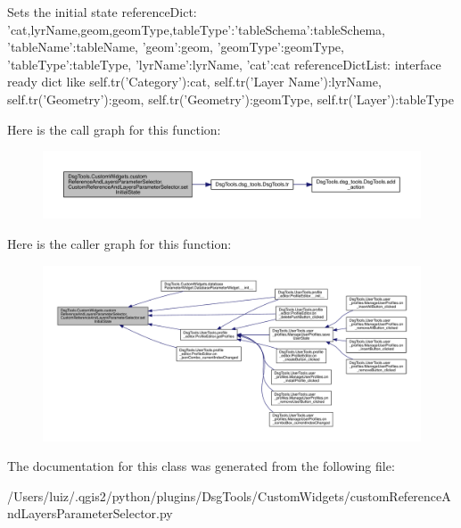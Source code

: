 \begin{DoxyVerb}Sets the initial state
referenceDict: {'cat,lyrName,geom,geomType,tableType':{'tableSchema':tableSchema, 'tableName':tableName, 'geom':geom, 'geomType':geomType, 'tableType':tableType, 'lyrName':lyrName, 'cat':cat}}
referenceDictList: interface ready dict like 
{
    self.tr('Category'):cat, 
    self.tr('Layer Name'):lyrName, 
    self.tr('Geometry\nColumn'):geom, 
    self.tr('Geometry\nType'):geomType, 
    self.tr('Layer\nType'):tableType
}
\end{DoxyVerb}
 Here is the call graph for this function\+:
\nopagebreak
\begin{figure}[H]
\begin{center}
\leavevmode
\includegraphics[width=350pt]{class_dsg_tools_1_1_custom_widgets_1_1custom_reference_and_layers_parameter_selector_1_1_custom_962aafd2d8f85861a2c944521ade35a6_a8f6443179698e87d12f29b01041c33cd_cgraph}
\end{center}
\end{figure}
Here is the caller graph for this function\+:
\nopagebreak
\begin{figure}[H]
\begin{center}
\leavevmode
\includegraphics[width=350pt]{class_dsg_tools_1_1_custom_widgets_1_1custom_reference_and_layers_parameter_selector_1_1_custom_962aafd2d8f85861a2c944521ade35a6_a8f6443179698e87d12f29b01041c33cd_icgraph}
\end{center}
\end{figure}


The documentation for this class was generated from the following file\+:\begin{DoxyCompactItemize}
\item 
/\+Users/luiz/.\+qgis2/python/plugins/\+Dsg\+Tools/\+Custom\+Widgets/custom\+Reference\+And\+Layers\+Parameter\+Selector.\+py\end{DoxyCompactItemize}
